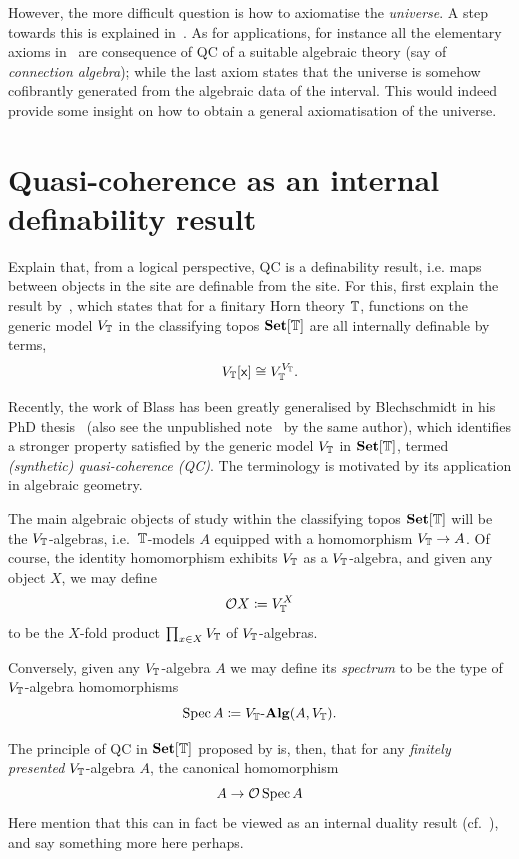 However, the more difficult question is how to axiomatise the \emph{universe}. A step towards this is explained in~\citet{JazMyers_Liberating}. As for applications, for instance all the elementary axioms in~\citet{orton_axioms_2018} are consequence of \gls{QC} of a suitable algebraic theory (say of \emph{connection algebra}); while the last axiom states that the universe is somehow cofibrantly generated from the algebraic data of the interval. This would indeed provide some insight on how to obtain a general axiomatisation of the universe.

\section{Quasi-coherence as an internal definability result}

Explain that, from a logical perspective, \gls{QC} is a definability result, i.e. maps between objects in the site are definable from the site. For this, first explain the result by~\citet{RN879}, which states that for a finitary Horn theory $\mathbb{T}$, functions on the generic model $V_{\mathbb{T}}$ in the classifying topos $\mathbf{Set}[\mathbb{T}]$ are all internally definable by terms,
\[ V_{\mathbb{T}}[\mathsf{x}] \cong V_{\mathbb{T}}^{V_{\mathbb{T}}}. \]

Recently, the work of Blass has been greatly generalised by Blechschmidt in his PhD thesis~\citep{blechschmidt:2017} (also see the unpublished note~\citep{blechschmidt_general_2020} by the same author), which identifies a stronger property satisfied by the generic model $V_{\mathbb{T}}$ in $\mathbf{Set}[\mathbb{T}]$, termed \emph{(synthetic) quasi-coherence (\gls{QC})}. The terminology is motivated by its application in algebraic geometry.

The main algebraic objects of study within the classifying topos $\mathbf{Set}[\mathbb{T}]$ will be the $V_{\mathbb{T}}$-algebras, i.e.\ $\mathbb{T}$-models $A$ equipped with a homomorphism $V_{\mathbb{T}}\to A$. Of course, the identity homomorphism exhibits $V_{\mathbb{T}}$ as a $V_{\mathbb{T}}$-algebra, and given any object $X$, we may define \[\mathcal{O} X\coloneq V_{\mathbb{T}}^X\] to be the $X$-fold product $\prod_{x\in X}V_{\mathbb{T}}$ of $V_{\mathbb{T}}$-algebras. 

Conversely, given any $V_{\mathbb{T}}$-algebra $A$ we may define its \emph{spectrum} to be the type of $V_{\mathbb{T}}$-algebra homomorphisms 
\[ \operatorname{Spec} A \coloneq V_{\mathbb{T}}\text{-}\mathbf{Alg}(A,V_{\mathbb{T}})\text{.}\]

The principle of \gls{QC} in $\mathbf{Set}[\mathbb{T}]$ proposed by \citet{blechschmidt:2017} is, then, that for any \emph{finitely presented} $V_{\mathbb{T}}$-algebra $A$, the canonical homomorphism
\[
  A\to \mathcal{O}\operatorname{Spec} A
\]
Here mention that this can in fact be viewed as an internal duality result (cf.~), and say something more here perhaps.

